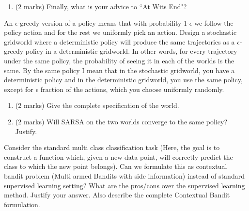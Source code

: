 \documentclass[addpoints,12pt,solution]{exam}
\begin{document}
\begin{questions}
\begin{enumerate}[label=(\alph*)]
            \begin{solution}


            \end{solution}

            \item (2 marks) Finally, what is your advice to ``At Wits End"?

            \begin{solution}


            \end{solution}


        \end{enumerate}

         An $\epsilon$-greedy version of a policy means that with probability 1-$\epsilon$ we follow the policy action and for the rest we uniformly pick an action.
        Design a stochastic gridworld where a deterministic policy will produce
        the same trajectories as a $\epsilon$-greedy policy in a deterministic
        gridworld. In other words, for every trajectory under the same policy, the
        probability of seeing it in each of the worlds is the same. By the same policy I mean that in the stochastic gridworld, you have a deterministic policy and in the
        deterministic gridworld, you use the same policy, except for $\epsilon$ fraction of the actions, which you choose uniformly randomly.

        \begin{enumerate}[label=(\alph*)]

            \item (2 marks) Give the complete specification of the world.

            \begin{solution}


            \end{solution}


            \item (2 marks) Will SARSA on the two worlds converge to the same policy? Justify.

            \begin{solution}

            \end{solution}

        \end{enumerate}

         Consider the standard multi class classification task (Here, the goal is to construct a function which, given a new data point, will correctly predict the class to which the new point belongs). Can we formulate this as contextual bandit problem (Multi armed Bandits with side information) instead of standard supervised learning setting? What are the pros/cons over the supervised learning method. Justify your answer. Also describe the complete Contextual Bandit formulation.


\end{questions}
\end{document}
